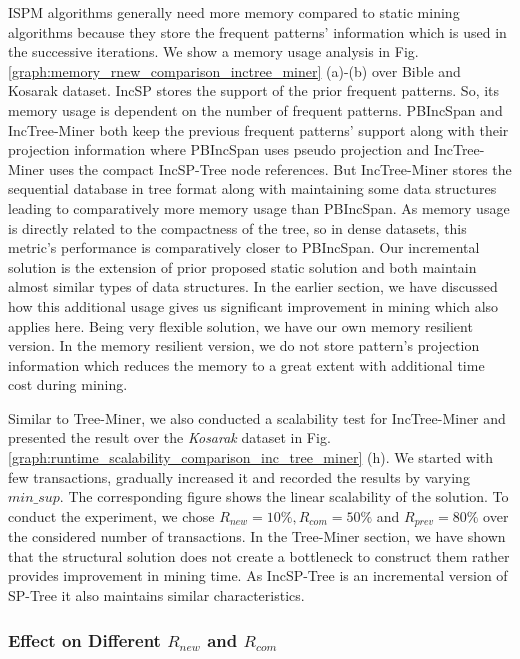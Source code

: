 ISPM algorithms generally need more memory compared to static mining algorithms because they store the frequent patterns' information which is used in the successive iterations. We show a memory usage analysis in Fig. \ref{graph:memory_rnew_comparison_inctree_miner} (a)-(b) over Bible and Kosarak dataset. IncSP stores the support of the prior frequent patterns. So, its memory usage is dependent on the number of frequent patterns. PBIncSpan and IncTree-Miner both keep the previous frequent patterns' support along with their projection information where PBIncSpan uses pseudo projection and IncTree-Miner uses the compact IncSP-Tree node references. But IncTree-Miner stores the sequential database in tree format along with maintaining some data structures leading to comparatively more memory usage than PBIncSpan. As memory usage is directly related to the compactness of the tree, so in dense datasets, this metric's performance is comparatively closer to PBIncSpan. Our incremental solution is the extension of prior proposed static solution and both maintain almost similar types of data structures. In the earlier section, we have discussed how this additional usage gives us significant improvement in mining which also applies here. Being very flexible solution, we have our own memory resilient version. In the memory resilient version, we do not store pattern's projection information which reduces the memory to a great extent with additional time cost during mining.   

Similar to Tree-Miner, we also conducted a scalability test for IncTree-Miner and presented the result over the \textit{Kosarak} dataset in Fig. \ref{graph:runtime_scalability_comparison_inc_tree_miner} (h). We started with few transactions, gradually increased it and recorded the results by varying $min\_sup$. The corresponding figure shows the linear scalability of the solution. To conduct the experiment, we chose $R_{new}=10\%,R_{com}=50\%$ and $R_{prev}=80\%$ over the considered number of transactions. In the Tree-Miner section, we have shown that the structural solution does not create a bottleneck to construct them rather provides improvement in mining time. As IncSP-Tree is an incremental version of SP-Tree it also maintains similar characteristics.   





\subsubsection{Effect on Different $R_{new}$ and $R_{com}$}

